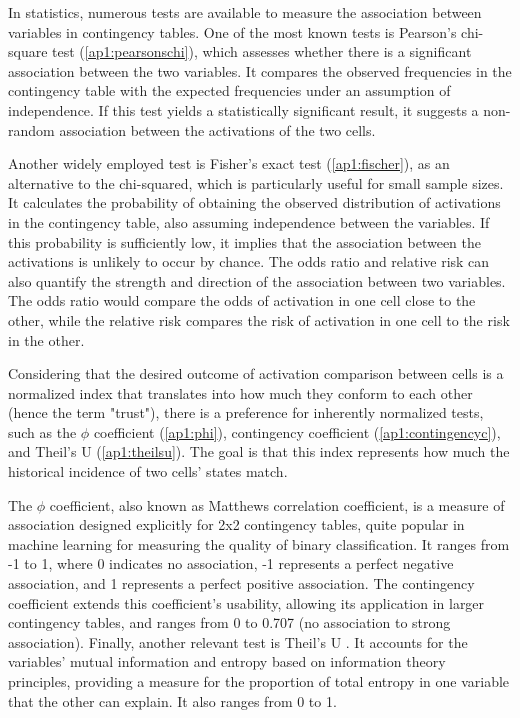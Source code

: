 In statistics, numerous tests are available to measure the association between variables in contingency tables. One of the most known tests is Pearson's chi-square test (\ref{ap1:pearsonschi}), which assesses whether there is a significant association between the two variables. It compares the observed frequencies in the contingency table with the expected frequencies under an assumption of independence. If this test yields a statistically significant result, it suggests a non-random association between the activations of the two cells.

Another widely employed test is Fisher's exact test (\ref{ap1:fischer}), as an alternative to the chi-squared, which is particularly useful for small sample sizes. It calculates the probability of obtaining the observed distribution of activations in the contingency table, also assuming independence between the variables. If this probability is sufficiently low, it implies that the association between the activations is unlikely to occur by chance. The odds ratio and relative risk can also quantify the strength and direction of the association between two variables. The odds ratio would compare the odds of activation in one cell close to the other, while the relative risk compares the risk of activation in one cell to the risk in the other.

Considering that the desired outcome of activation comparison between cells is a normalized index that translates into how much they conform to each other (hence the term "trust"), there is a preference for inherently normalized tests, such as the $\phi$ coefficient (\ref{ap1:phi}), contingency coefficient (\ref{ap1:contingencyc}), and Theil's U (\ref{ap1:theilsu}). The goal is that this index represents how much the historical incidence of two cells' states match.

The $\phi$ coefficient, also known as Matthews correlation coefficient, is a measure of association designed explicitly for 2x2 contingency tables, quite popular in machine learning for measuring the quality of binary classification. It ranges from -1 to 1, where 0 indicates no association, -1 represents a perfect negative association, and 1 represents a perfect positive association. The contingency coefficient extends this coefficient's usability, allowing its application in larger contingency tables, and ranges from 0 to 0.707 (no association to strong association).
Finally, another relevant test is Theil's U . It accounts for the variables' mutual information and entropy based on information theory principles, providing a measure for the proportion of total entropy in one variable that the other can explain. It also ranges from 0 to 1.

